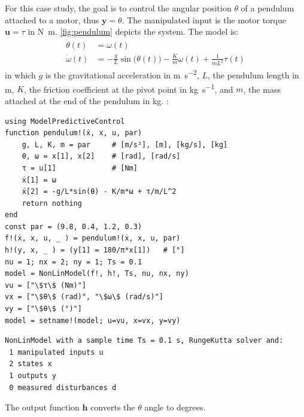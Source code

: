 For this case study, the goal is to control the angular position $\theta$ of a pendulum attached to a motor, thus $\mathbf{y} = \theta$. The manipulated input is the motor torque $\mathbf{u} = \tau$ in \si{\newton\meter}. \cref{fig:pendulum} depicts the system. The model is:
\begin{subequations}
\begin{align}
\dot{\theta}(t) &= \omega(t) \\
\dot{\omega}(t) &= -\frac{g}{L}\sin\big(\theta(t)\big) -\frac{K}{m}\omega(t) + \frac{1}{m L^2}\tau(t) \label{eq.pendulum_speed}
\end{align}
\end{subequations}
in which $g$ is the gravitational acceleration in \si{\meter\per\second\squared}, $L$, the pendulum length in \si{\meter}, $K$, the friction coefficient at the pivot point in \si{\kilogram\per\second}, and $m$, the mass attached at the end of the pendulum in \si{\kilogram}. : 
\vspace*{-5pt}
\begin{verbatim}
using ModelPredictiveControl
function pendulum!(ẋ, x, u, par)
    g, L, K, m = par     # [m/s²], [m], [kg/s], [kg]
    θ, ω = x[1], x[2]    # [rad], [rad/s]
    τ = u[1]             # [Nm]
    ẋ[1] = ω
    ẋ[2] = -g/L*sin(θ) - K/m*ω + τ/m/L^2
    return nothing
end
const par = (9.8, 0.4, 1.2, 0.3)
f!(ẋ, x, u, _ ) = pendulum!(ẋ, x, u, par)
h!(y, x, _ ) = (y[1] = 180/π*x[1])   # [°]
nu = 1; nx = 2; ny = 1; Ts = 0.1
model = NonLinModel(f!, h!, Ts, nu, nx, ny)
vu = ["\$τ\$ (Nm)"]
vx = ["\$θ\$ (rad)", "\$ω\$ (rad/s)"]
vy = ["\$θ\$ (°)"]
model = setname!(model; u=vu, x=vx, y=vy)
\end{verbatim}
\spacerepl
\begin{verbatim}
NonLinModel with a sample time Ts = 0.1 s, RungeKutta solver and:
 1 manipulated inputs u
 2 states x
 1 outputs y
 0 measured disturbances d
\end{verbatim}

The output function $\mathbf{h}$ converts the $\theta$ angle to degrees. 

